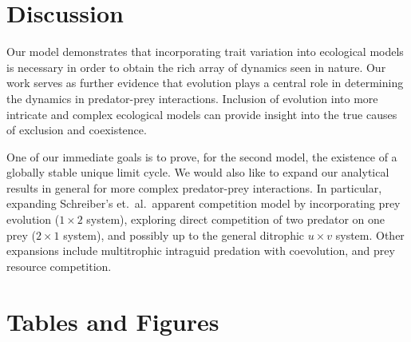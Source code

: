 \documentclass{amsart}
\theoremstyle{definition}
\theoremstyle{remark}
\numberwithin{equation}{section}
\begin{document}
\section{Discussion}

Our model demonstrates that incorporating trait variation into ecological models is necessary in order to obtain the rich array of dynamics seen in nature.  Our work serves as further evidence that evolution plays a central role in determining the dynamics in predator-prey interactions.  Inclusion of evolution into more intricate and complex ecological models can provide insight into the true causes of exclusion and coexistence.

One of our immediate goals is to prove, for the second model, the existence of a globally stable unique limit cycle.  We would also like to expand our analytical results in general for more complex predator-prey interactions.  In particular, expanding Schreiber's et.~al.~apparent competition model by incorporating prey evolution ($1 \times 2$ system), exploring direct competition of two predator on one prey ($2 \times 1$ system), and possibly up to the general ditrophic $u \times v$ system.  Other expansions include multitrophic intraguid predation with coevolution, and prey resource competition.






























\FloatBarrier
\pagebreak
\section{Tables and Figures}
\end{document}
